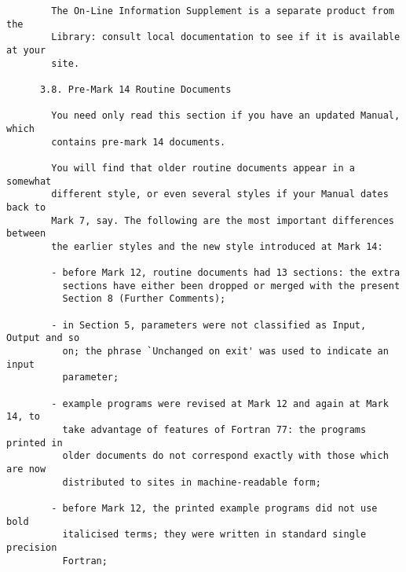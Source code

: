 \begin{small}
\begin{verbatim}
        The On-Line Information Supplement is a separate product from the         
        Library: consult local documentation to see if it is available at your    
        site.                                                                     
                                                                                  
      3.8. Pre-Mark 14 Routine Documents                                          
                                                                                  
        You need only read this section if you have an updated Manual, which      
        contains pre-mark 14 documents.                                           
                                                                                  
        You will find that older routine documents appear in a somewhat           
        different style, or even several styles if your Manual dates back to      
        Mark 7, say. The following are the most important differences between     
        the earlier styles and the new style introduced at Mark 14:               
                                                                                  
        - before Mark 12, routine documents had 13 sections: the extra            
          sections have either been dropped or merged with the present            
          Section 8 (Further Comments);                                           
                                                                                  
        - in Section 5, parameters were not classified as Input, Output and so    
          on; the phrase `Unchanged on exit' was used to indicate an input        
          parameter;                                                              
                                                                                  
        - example programs were revised at Mark 12 and again at Mark 14, to       
          take advantage of features of Fortran 77: the programs printed in       
          older documents do not correspond exactly with those which are now      
          distributed to sites in machine-readable form;                          
                                                                                  
        - before Mark 12, the printed example programs did not use bold           
          italicised terms; they were written in standard single precision        
          Fortran;                                                                
                                                                                  

\end{verbatim}
\end{small}
